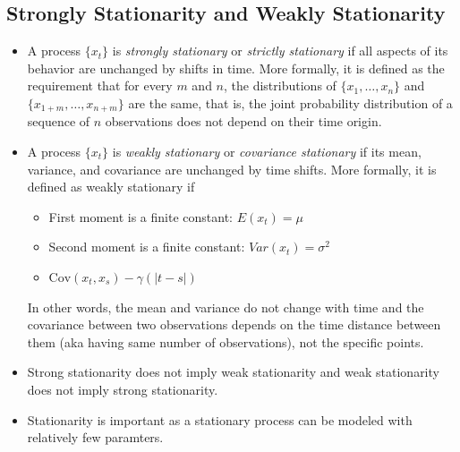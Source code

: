 \documentclass[11pt]{article}
\begin{document}
\subsection{Strongly Stationarity and Weakly Stationarity}
\begin{itemize}
    \item A process $\{x_t\}$ is \textit{strongly stationary} or \textit{strictly stationary}
    if all aspects of its behavior are unchanged by shifts in time. More formally, it is
    defined as the requirement that for every $m$ and $n$, the distributions of $\{x_1, \ldots,
    x_n\}$ and $\{x_{1+m}, \ldots, x_{n+m}\}$ are the same, that is, the joint probability 
    distribution of a sequence of $n$ observations does not depend on their time origin.
   \item A process $\{x_t\}$ is \textit{weakly stationary} or \textit{covariance stationary} if 
   its mean, variance, and covariance are unchanged by time shifts. More formally, it is 
   defined as weakly stationary if 
   \begin{itemize}
    \item First moment is a finite constant: $E(x_t) = \mu$
    \item Second moment is a finite constant: $Var(x_t) = \sigma^2$
    \item $\text{Cov}(x_t, x_s) - \gamma(|t-s|)$
   \end{itemize}
   In other words, the mean and variance do not change with time and the covariance between 
   two observations depends on the time distance between them (aka having same number of 
   observations), not the specific points. 
   \item Strong stationarity does not imply weak stationarity and weak stationarity does not 
   imply strong stationarity.    
   \item Stationarity is important as a stationary process can be modeled with relatively few 
   paramters.
\end{itemize}
\end{document}
